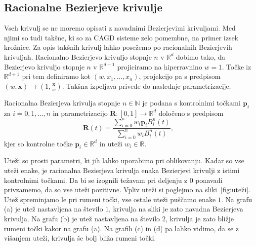 \documentclass[isrm2, tisk]{fmfdelo}
\newcommand{\R}{\mathbb R}
\newcommand{\N}{\mathbb N}
\newcommand{\p}{\mathbf{p}}
\begin{document}
    \subsection{Racionalne Bezierjeve krivulje}
    Vseh krivulj se ne moremo opisati z navadnimi Bezierjevimi krivuljami.
    Med njimi so tudi takšne, ki so za CAGD sisteme zelo pomembne, na primer izsek krožnice.
    Za opis takšnih krivulj lahko posežemo po racionalnih Bezierjevih krivuljah.
    Racionalno Bezierjevo krivuljo stopnje $n$ v $\R^d$ dobimo tako, da Bezierjevo krivuljo stopnje $n$ v $\R^{d+1}$ projiciramo na hiperravnino $w=1$.
    Točke iz $\R^{d+1}$ pri tem definiramo kot $(w,x_1,\ldots,x_n)$, projekcijo pa s predpisom $(w,\mathbf{x})\to(1,\frac{\mathbf{x}}{w})$.
    Takšna izpeljava privede do naslednje parametrizacije.
    \begin{definicija}
        \label{def:racionalna}
        Racionalna Bezierjeva krivulja stopnje $n\in\N$ je podana s kontrolnimi točkami $\p_i$ za $i=0,1,\ldots,n$ in parametrizacijo $\mathbf{R}:[0,1]\to \R^d$  določeno s predpisom \[\mathbf{R}(t) = \frac{\sum^{n}_{i=0}w_i\p_i B^n_i(t)}{\sum^{n}_{i=0}w_i B^n_i(t)},\] kjer so kontrolne točke $\p_i\in\R^d$ in uteži $w_i\in\R$.
    \end{definicija}
    Uteži so prosti parametri, ki jih lahko uporabimo pri oblikovanju.
    Kadar so vse uteži enake, je racionalna Bezierjeva krivulja enaka Bezierjevi krivulji z istimi kontrolnimi točkami.
    Da bi se izognili težavam pri deljenju z $0$ ponavadi privzamemo, da so vse uteži pozitivne.
    Vpliv uteži si poglejmo na sliki~\ref{fig:uteži}.
    Utež spreminjamo le pri rumeni točki, vse ostale uteži puščamo enake $1$.
    Na grafu (a) je utež nastavljena na število $1$, krivulja na sliki je zato navadna Bezierjeva krivulja.
    Na grafu (b) je utež nastavljena na število $2$, krivulja je zato bližje rumeni točki kakor na grafu (a).
    Na grafih (c) in (d) pa lahko vidimo, da se z višanjem uteži, krivulja še bolj bliža rumeni točki.
\end{document}
